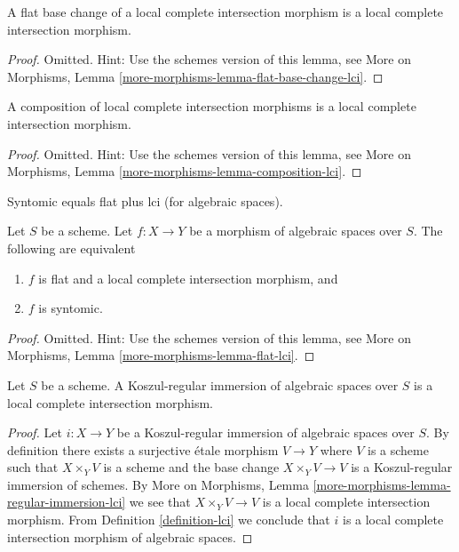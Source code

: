 \begin{lemma}
\label{lemma-flat-base-change-lci}
A flat base change of a local complete intersection morphism is a
local complete intersection morphism.
\end{lemma}

\begin{proof}
Omitted. Hint: Use the schemes version of this lemma, see
More on Morphisms,
Lemma \ref{more-morphisms-lemma-flat-base-change-lci}.
\end{proof}

\begin{lemma}
\label{lemma-composition-lci}
A composition of local complete intersection morphisms is a
local complete intersection morphism.
\end{lemma}

\begin{proof}
Omitted. Hint: Use the schemes version of this lemma, see
More on Morphisms,
Lemma \ref{more-morphisms-lemma-composition-lci}.
\end{proof}

\begin{lemma}
\label{lemma-flat-lci}
\begin{slogan}
Syntomic equals flat plus lci (for algebraic spaces).
\end{slogan}
Let $S$ be a scheme.
Let $f : X \to Y$ be a morphism of algebraic spaces over $S$.
The following are equivalent
\begin{enumerate}
\item $f$ is flat and a local complete intersection morphism, and
\item $f$ is syntomic.
\end{enumerate}
\end{lemma}

\begin{proof}
Omitted. Hint: Use the schemes version of this lemma, see
More on Morphisms,
Lemma \ref{more-morphisms-lemma-flat-lci}.
\end{proof}

\begin{lemma}
\label{lemma-regular-immersion-lci}
Let $S$ be a scheme. A Koszul-regular immersion of algebraic spaces
over $S$ is a local complete intersection morphism.
\end{lemma}

\begin{proof}
Let $i : X \to Y$ be a Koszul-regular immersion of algebraic spaces
over $S$. By definition there exists a surjective \'etale morphism
$V \to Y$ where $V$ is a scheme such that $X \times_Y V$ is a scheme
and the base change $X \times_Y V \to V$ is a Koszul-regular immersion of
schemes. By More on Morphisms, Lemma
\ref{more-morphisms-lemma-regular-immersion-lci} we see that
$X \times_Y V \to V$ is a local complete intersection morphism.
From Definition \ref{definition-lci} we conclude that $i$ is a
local complete intersection morphism of algebraic spaces.
\end{proof}

